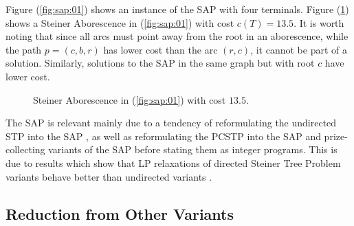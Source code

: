 Figure (\ref{fig:sap:01}) shows an instance of the SAP with four terminals. Figure (\ref{fig:sap:01:opt}) shows a Steiner Aborescence in (\ref{fig:sap:01})
with cost $c(T) = 13.5$. It is worth noting that since all arcs must point away from the root in an aborescence, while the path $p = (c, b, r)$  has
 lower cost than the arc $(r, c)$, it cannot be part of a solution. Similarly, solutions to the SAP in the same graph but with root $c$ have lower cost.

\begin{figure}[h]\centering
{}
\caption{Steiner Aborescence in (\ref{fig:sap:01}) with cost $13.5$.}
\label{fig:sap:01:opt}
\end{figure}

The SAP is relevant mainly due to a tendency of reformulating the undirected STP into the SAP \citep{koch1998solving}, as well as reformulating
the PCSTP into the SAP \citep{gamrath2017scip, Ljubic:2004:memetic} and
prize-collecting variants of the SAP \citep{leitner2016dual, ljubic2005solving} before stating them as integer programs. This is due to results which show that LP relaxations of
 directed Steiner Tree Problem variants behave better than undirected variants \citep{Chopra:1994}.

\subsection{Reduction from Other Variants}

